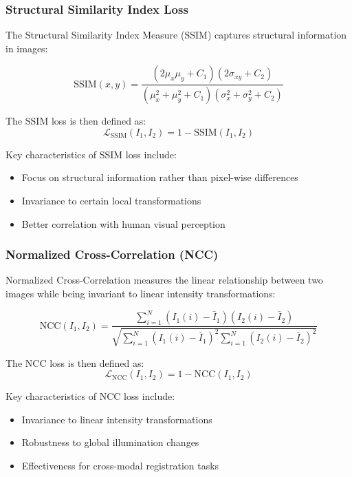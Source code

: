 \subsubsection{Structural Similarity Index Loss}

The Structural Similarity Index Measure (SSIM) captures structural information in images:

\begin{equation}
\text{SSIM}(x, y) = \frac{(2\mu_x\mu_y + C_1)(2\sigma_{xy} + C_2)}{(\mu_x^2 + \mu_y^2 + C_1)(\sigma_x^2 + \sigma_y^2 + C_2)}
\end{equation}

The SSIM loss is then defined as:
\begin{equation}
\mathcal{L}_{\text{SSIM}}(I_1, I_2) = 1 - \text{SSIM}(I_1, I_2)
\end{equation}

Key characteristics of SSIM loss include:
\begin{itemize}
    \item Focus on structural information rather than pixel-wise differences
    \item Invariance to certain local transformations
    \item Better correlation with human visual perception
\end{itemize}

\subsubsection{Normalized Cross-Correlation (NCC)}

Normalized Cross-Correlation measures the linear relationship between two images while being invariant to linear intensity transformations:

\begin{equation}
\text{NCC}(I_1, I_2) = \frac{\sum_{i=1}^{N} (I_1(i) - \bar{I}_1)(I_2(i) - \bar{I}_2)}{\sqrt{\sum_{i=1}^{N} (I_1(i) - \bar{I}_1)^2 \sum_{i=1}^{N} (I_2(i) - \bar{I}_2)^2}}
\end{equation}

The NCC loss is then defined as:
\begin{equation}
\mathcal{L}_{\text{NCC}}(I_1, I_2) = 1 - \text{NCC}(I_1, I_2)
\end{equation}

Key characteristics of NCC loss include:
\begin{itemize}
    \item Invariance to linear intensity transformations
    \item Robustness to global illumination changes
    \item Effectiveness for cross-modal registration tasks
\end{itemize}

